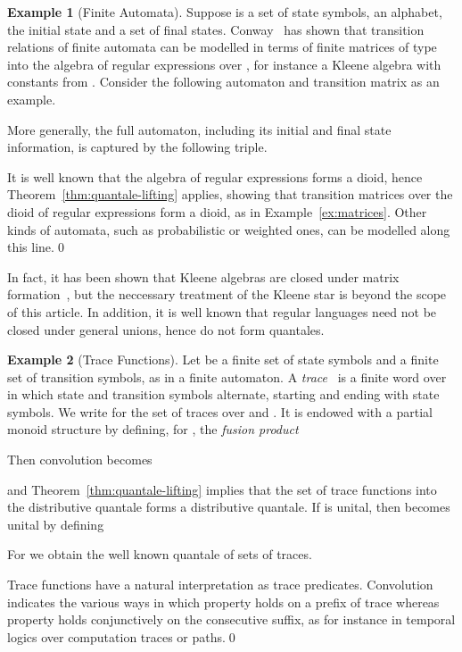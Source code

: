 \documentclass[12pt]{article}
\theoremstyle{definition}
\newtheorem{example}{Example}
\begin{document}
\begin{example}[Finite Automata]\label{ex:finite-automata} 
  Suppose  is a set of state symbols,  an alphabet,  the initial state and  a set of
  final states. Conway~\cite{Conway71} has shown that transition
  relations  of finite automata  can
  be modelled in terms of finite matrices of type  into the algebra of regular expressions
   over , for instance a Kleene algebra with
  constants from . Consider the following automaton and
  transition matrix as an example.

More generally, the full automaton, including its initial and final
state information, is captured by the following triple.


It is well known that the algebra of regular expressions forms a
dioid, hence Theorem~\ref{thm:quantale-lifting} applies, showing that
transition matrices over the dioid of regular expressions form a
dioid, as in Example~\ref{ex:matrices}. Other kinds of automata, such
as probabilistic or weighted ones, can be modelled along this
line.\qed
\end{example}
In fact, it has been shown that Kleene algebras are closed under
matrix formation~\cite{Kozen91}, but the neccessary treatment of the
Kleene star is beyond the scope of this article.  In addition, it is
well known that regular languages need not be closed under general
unions, hence do not form quantales.

\begin{example}[Trace Functions]\label{ex:traces}
  Let  be a finite set of state symbols and  a finite set
  of transition symbols, as in a finite automaton. A
  \emph{trace}~\cite{Eilenberg} is a finite word over
   in which state and transition symbols
  alternate, starting and ending with state symbols. We write
   for the set of traces over  and . It is
  endowed with a partial monoid structure by defining, for
  , the \emph{fusion
    product}
  
  Then convolution becomes 

and Theorem~\ref{thm:quantale-lifting} implies that the set
 of trace functions into the distributive quantale
 forms a distributive quantale. If  is unital, then
 becomes unital by defining

For  we obtain the well known quantale of sets of
traces.

Trace functions  have a natural
interpretation as trace predicates. Convolution 
indicates the various ways in which property  holds on a prefix of
trace  whereas property  holds conjunctively on the consecutive
suffix, as for instance in temporal logics over computation traces or
paths.\qed
\end{example}
\end{document}
